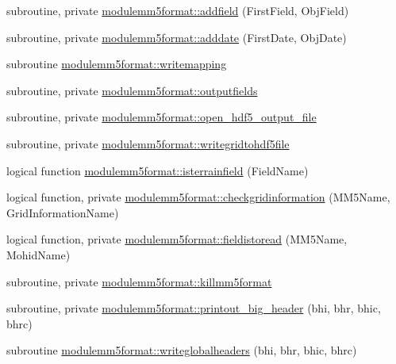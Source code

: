 \begin{DoxyCompactItemize}
\item 
subroutine, private \mbox{\hyperlink{namespacemodulemm5format_a136725afeaeb24f9488c92944b7b982a}{modulemm5format\+::addfield}} (First\+Field, Obj\+Field)
\item 
subroutine, private \mbox{\hyperlink{namespacemodulemm5format_a6db74d155aaf7a1fd0ac77423986f988}{modulemm5format\+::adddate}} (First\+Date, Obj\+Date)
\item 
subroutine \mbox{\hyperlink{namespacemodulemm5format_ab8eb4353dbcd1d51f336675a6f66b0e6}{modulemm5format\+::writemapping}}
\item 
subroutine, private \mbox{\hyperlink{namespacemodulemm5format_a3cfd45468121f8166d1e004ee05a5b0b}{modulemm5format\+::outputfields}}
\item 
subroutine, private \mbox{\hyperlink{namespacemodulemm5format_aeb412a3427b8b95fd51d277cd343e346}{modulemm5format\+::open\+\_\+hdf5\+\_\+output\+\_\+file}}
\item 
subroutine, private \mbox{\hyperlink{namespacemodulemm5format_a752f2b2f864f9d5601283baf96f7397f}{modulemm5format\+::writegridtohdf5file}}
\item 
logical function \mbox{\hyperlink{namespacemodulemm5format_ae5ec2f854445619a5a7132875dc4d803}{modulemm5format\+::isterrainfield}} (Field\+Name)
\item 
logical function, private \mbox{\hyperlink{namespacemodulemm5format_af3c3e0015f7df36b0498d741f6d745c3}{modulemm5format\+::checkgridinformation}} (M\+M5\+Name, Grid\+Information\+Name)
\item 
logical function, private \mbox{\hyperlink{namespacemodulemm5format_a0fb6edd1ddbebdd980a7396df7323e1a}{modulemm5format\+::fieldistoread}} (M\+M5\+Name, Mohid\+Name)
\item 
subroutine, private \mbox{\hyperlink{namespacemodulemm5format_a2c04440614e11a95fbe1732cd8110590}{modulemm5format\+::killmm5format}}
\item 
subroutine, private \mbox{\hyperlink{namespacemodulemm5format_a406c18c9d5a54d074a43f1f1252ebdde}{modulemm5format\+::printout\+\_\+big\+\_\+header}} (bhi, bhr, bhic, bhrc)
\item 
subroutine \mbox{\hyperlink{namespacemodulemm5format_a56429c53d699bf7bc1af81bd292f7d95}{modulemm5format\+::writeglobalheaders}} (bhi, bhr, bhic, bhrc)
\end{DoxyCompactItemize}

